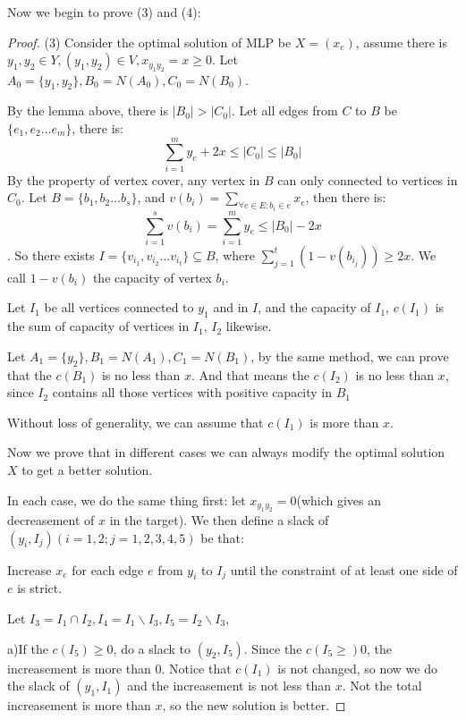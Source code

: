     Now we begin to prove (3) and (4): 

    \begin{proof}
    (3) Consider the optimal solution of MLP be $X=(x_e)$, assume there is 
    $y_1,y_2\in Y, (y_1,y_2)\in V,x_{y_1y_2}=x\geq 0$. Let $A_0=\{y_1,y_2\}, B_0=N(A_0), C_0=N(B_0)$. 
    
    By the lemma above, there is $|B_0|>|C_0|$. Let all edges from $C$ to $B$ be $\{e_1,e_2\dots e_m\}$, 
    there is: 
    $$\sum_{i=1}^m y_e+2x\leq |C_0|\leq |B_0|$$
    By the property of vertex cover, any vertex in $B$ can only connected to vertices in $C_0$. 
    Let $B=\{b_1,b_2\dots b_s\}$, and $v(b_i)=\sum_{\forall e\in E:b_i\in e}x_e$, then there is: 
    $$\sum_{i=1}^s v(b_i)=\sum_{i=1}^m y_e\leq |B_0|-2x$$. 
    So there exists $I=\{v_{i_1}, v_{i_2}\dots v_{i_t}\}\subseteq B$, where $\sum_{j=1}^t (1-v(b_{i_j}))\geq 2x$. 
    We call $1-v(b_i)$ the capacity of vertex $b_i$. 
    
    Let $I_1$ be all vertices connected to $y_1$ and in $I$, 
    and the capacity of $I_1$, $c(I_1)$ is the sum of capacity of vertices in $I_1$, $I_2$ likewise. 

    Let $A_1=\{y_2\},B_1=N(A_1),C_1=N(B_1)$, by the same method, we can prove that the $c(B_1)$ is no less than $x$. 
    And that means the $c(I_2)$ is no less than $x$, since $I_2$ contains all those vertices with positive capacity in $B_1$

    Without loss of generality, we can assume that $c(I_1)$ is more than $x$. 

    Now we prove that in different cases we can always modify the optimal solution $X$ to get a better solution. 

    In each case, we do the same thing first: let $x_{y_1y_2}=0$(which gives an decreasement of $x$ in the target). 
    We then define a slack of $(y_i,I_j)(i=1,2;j=1,2,3,4,5)$ be that: 

    Increase $x_e$ for each edge $e$ from $y_i$ to $I_j$ until the constraint of at least one side of $e$ is strict. 

    Let $I_3=I_1\cap I_2, I_4=I_1\backslash I_3, I_5=I_2\backslash I_3$, 
    
    a)If the $c(I_5)\geq 0$, do a slack to $(y_2,I_5)$. 
    Since the $c(I_5\geq )0$, the increasement is more than $0$. 
    Notice that $c(I_1)$ is not changed, so now we do the slack of $(y_1,I_1)$ and the increasement is not less than $x$. 
    Not the total increasement is more than $x$, so the new solution is better. 


\end{proof}
